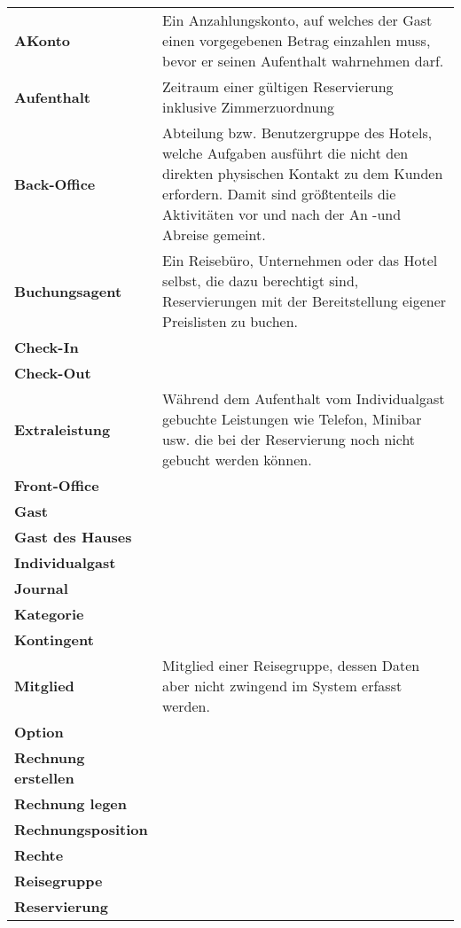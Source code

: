 \documentclass[../Pflichtenheft.tex]{subfiles}
\begin{document}
    \begin{longtable}{p{5cm} p{10cm}}
        \textbf{AKonto} & Ein Anzahlungskonto, auf welches der Gast einen vorgegebenen Betrag einzahlen muss, bevor er seinen Aufenthalt wahrnehmen darf. \\[0.5cm]
        \textbf{Aufenthalt} & Zeitraum einer gültigen Reservierung inklusive Zimmerzuordnung \\[0.5cm]
        \textbf{Back-Office} & Abteilung bzw. Benutzergruppe des Hotels, welche Aufgaben ausführt die nicht den direkten physischen Kontakt zu dem Kunden erfordern. Damit sind größtenteils die Aktivitäten vor und nach der An -und Abreise gemeint.\\[0.5cm]
        \textbf{Buchungsagent} & Ein Reisebüro, Unternehmen oder das Hotel selbst, die dazu berechtigt sind, Reservierungen mit der Bereitstellung eigener Preislisten zu buchen. \\[0.5cm]
        \textbf{Check-In} & \\[0.5cm]
        \textbf{Check-Out} & \\[0.5cm]
        \textbf{Extraleistung} & Während dem Aufenthalt vom Individualgast gebuchte Leistungen wie Telefon, Minibar usw. die bei der Reservierung noch nicht gebucht werden können.\\[0.5cm]
        \textbf{Front-Office} &  \\[0.5cm]
        \textbf{Gast} & \\[0.5cm]
        \textbf{Gast des Hauses} & \\[0.5cm]
        \textbf{Individualgast} & \\[0.5cm]
        \textbf{Journal} & \\[0.5cm]
        \textbf{Kategorie} &  \\[0.5cm]
        \textbf{Kontingent} & \\[0.5cm]
        \textbf{Mitglied} & Mitglied einer Reisegruppe, dessen Daten aber nicht zwingend im System erfasst werden. \\[0.5cm]
        \textbf{Option} & \\[0.5cm]
        \textbf{Rechnung erstellen} & \\[0.5cm]
        \textbf{Rechnung legen} & \\[0.5cm]
        \textbf{Rechnungsposition} & \\[0.5cm]
        \textbf{Rechte} & \\[0.5cm]
        \textbf{Reisegruppe} & \\[0.5cm]
        \textbf{Reservierung} & \\[0.5cm]

\end{longtable}
\end{document}

